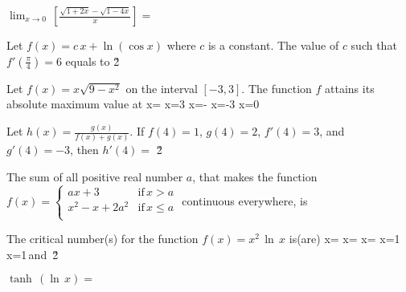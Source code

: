 \documentclass[amsfonts,bezier,leqno,fleqn,12pt,a4paper]{article}
\begin{document}
{{{{\begin{large}
\item %
$\displaystyle \lim_{x\rightarrow 0}\, \left[ \frac{\sqrt{1+2x}-\sqrt{1-4x}}{x}\right]=$
\sc
{}
\ee
{}
\ee
{}
\ee
{}
\ee
{}
\ee

\newpage



\item %
Let $f(x)=c\,x+\ln(\cos x)$ where $c$ is a constant. The value of $c$ such that $f'(\displaystyle \frac{\pi}{4})=6$ equals to
\sc
{}
\ee
{}
\ee
{}
\ee
{}
\ee
{}
\ee
\v2



\item %
Let $\displaystyle f(x)=x\sqrt{9-x^2}$ on the interval $[-3,3]$. The function $f$ attains its absolute maximum value at
\sc
\be
\displaystyle x=\displaystyle{}
\ee
\be
\displaystyle x=3
\ee
\be
\displaystyle x=\displaystyle-
\ee
\be
x=-3
\ee
\be
x=0
\ee

\newpage



\item %
Let $\displaystyle h(x)=\frac{g(x)}{f(x)+g(x)}$. If $f(4)=1$, $g(4)=2$, $f'(4)=3$, and $g'(4)=-3$, then $h'(4)=$
\sc
{}
\ee
{}
\ee
{}
\ee
{}
\ee
{}
\ee
\v2



\item %
The sum of all positive real number $a$, that makes the function\\[0.2in] $\displaystyle f(x)= \left\{\begin{array}{lll} ax+3 & \mbox{if}\,x>a\\ \displaystyle x^2-x+2a^2 & \mbox{if}\,x\leq a  \\ \end{array}\right.$ continuous everywhere, is
\sc
{}
\ee
\be
{}
\ee
{}
\ee
\be
\displaystyle {}
\ee
\be
\displaystyle {}
\ee

\newpage



\item %
The critical number(s) for the function $\displaystyle f(x)=x^2\,\ln\,x$ is(are)
\sc
\be
\displaystyle x=
\ee
\be
\displaystyle x=\displaystyle{}
\ee
\be
\displaystyle x=
\ee
\be
x=1
\ee
\be
\displaystyle x=1\,\mbox{and}\,
\ee
\v2



\item %
$\displaystyle \tanh \, (\ln\,x)=$
\sc
\be
\displaystyle {}
\ee
{}
\ee
\be
\displaystyle {}
\ee
\be
\displaystyle {}
\ee
\be
\displaystyle {}
\ee


\end{large}}}}}
\end{document}
